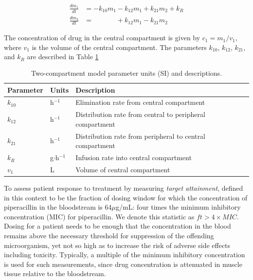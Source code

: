 \documentclass{article}\usepackage[]{graphicx}\usepackage[]{color}
\newcommand{\mic}{$ft > 4 \times MIC$}
\begin{document}
\begin{align}
\frac{dm_1}{dt} &= -k_{10}m_1 - k_{12}m_1 + k_{21}m_2 + k_R \nonumber \\
\frac{dm_2}{dt} &= \phantom{-k_{10}m_1} + k_{12}m_1 - k_{21}m_2 \nonumber
\end{align}

The concentration of drug in the central compartment is given by $c_1 = m_1/v_1$, where $v_1$ is the volume of the central compartment. The parameters $k_{10}$, $k_{12}$, $k_{21}$, and $k_R$ are described in Table \ref{tab:pkpars}

\begin{table}
\begin{tabular}{lll} \hline
Parameter & Units & Description \\ \hline
$k_{10}$ & h$^{-1}$ & Elimination rate from central compartment\\
$k_{12}$ & h$^{-1}$ & Distribution rate from central to peripheral compartment\\
$k_{21}$ & h$^{-1}$ & Distribution rate from peripheral to central compartment\\
$k_R$  & g$\cdot$h$^{-1}$ & Infusion rate into central compartment\\
$v_1$  & L & Volume of central compartment\\
\hline
\end{tabular}
\caption{Two-compartment model parameter units (SI) and descriptions. \label{tab:pkpars}}
\end{table}

To assess patient response to treatment by measuring {\it target attainment}, defined in this context to be the fraction of dosing window for which the concentration of piperacillin in the bloodstream is 64$\mu$g/mL: four times the minimum inhibitory concentration (MIC) for piperacillin. We denote this statistic as \mic. Dosing for a patient needs to be enough that the concentration in the blood remains above the necessary threshold for suppression of the offending microorganism, yet not so high as to increase the risk of adverse side effects including toxicity. Typically, a multiple of the minimum inhibitory concentration is used for such measurements, since drug concentration is attenuated in muscle tissue relative to the bloodstream. \\
\end{document}
